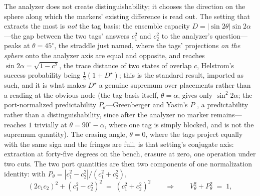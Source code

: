 \documentclass[11pt]{article}
\theoremstyle{definition}
\begin{document}
The analyzer does not create distinguishability; it chooses the direction on the sphere along which the markers' existing difference is read out. The setting that extracts the most is \emph{not} the tag basis: the ensemble capacity $D = |\sin 2\theta| \sin 2\alpha$---the gap between the two tags' answers $c_1^2$ and $c_2^2$ to the analyzer's question---peaks at $\theta = 45^\circ$, the straddle just named, where the tags' projections \emph{on the sphere} onto the analyzer axis are equal and opposite, and reaches $\sin 2\alpha = \sqrt{1 - c^2}$, the trace distance of two states of overlap $c$, Helstrom's success probability being $\tfrac12(1 + D^{\star})$; this is the standard result, imported as such, and it is what makes $D^{\star}$ a genuine supremum over placements rather than a reading at the obvious node (the tag basis itself, $\theta = \alpha$, gives only $\sin^2 2\alpha$; the port-normalized predictability $P_\theta$---Greenberger and Yasin's $P$ \cite{greenberger1988}, a predictability rather than a distinguishability, since after the analyzer no marker remains---reaches $1$ trivially at $\theta = 90^\circ - \alpha$, where one tag is simply blocked, and is not the supremum quantity). The erasing angle, $\theta = 0$, where the tags project equally with the same sign and the fringes are full, is that setting's conjugate axis: extraction at forty-five degrees on the bench, erasure at zero, one operation under two cuts. The two port quantities are then two components of one normalization identity: with $P_\theta = |c_1^2 - c_2^2|/(c_1^2 + c_2^2)$,
\[ (2 c_1 c_2)^2 + (c_1^2 - c_2^2)^2 \;=\; (c_1^2 + c_2^2)^2 \qquad\Longrightarrow\qquad V_\theta^2 + P_\theta^2 \;=\; 1, \]
\end{document}
